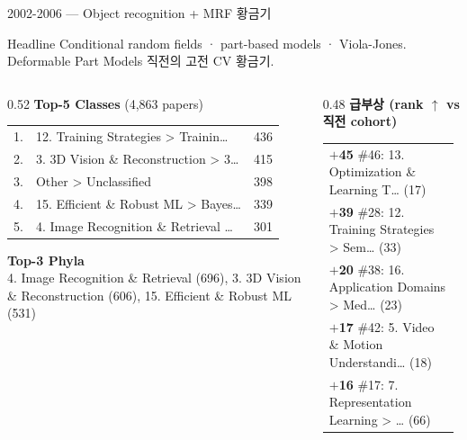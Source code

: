 \documentclass[aspectratio=169,t]{beamer}
\newcommand{\hot}[1]{\textcolor{accentorange}{\textbf{#1}}}
\newcommand{\muted}[1]{\textcolor{mutedgray}{#1}}
\begin{document}
\begin{frame}{2002-2006 \quad — \quad Object recognition + MRF 황금기}
\small
\begin{block}{Headline}
Conditional random fields · part-based models · Viola-Jones. Deformable Part Models 직전의 고전 CV 황금기.
\end{block}
\vspace{4pt}

\begin{columns}[T,onlytextwidth]
\begin{column}{0.52\textwidth}
\textbf{Top-5 Classes} \muted{\scriptsize (4,863 papers)}\\[2pt]
\scriptsize
\begin{tabular}{@{}rlr@{}}
    1. & 12. Training Strategies > Trainin… & 436 \\
    2. & 3. 3D Vision \& Reconstruction > 3… & 415 \\
    3. & Other > Unclassified & 398 \\
    4. & 15. Efficient \& Robust ML > Bayes… & 339 \\
    5. & 4. Image Recognition \& Retrieval … & 301 \\
\end{tabular}
\vspace{8pt}

\textbf{\small Top-3 Phyla}\\[2pt]
\scriptsize 4. Image Recognition \& Retrieval (696), 3. 3D Vision \& Reconstruction (606), 15. Efficient \& Robust ML (531)
\end{column}

\begin{column}{0.48\textwidth}
\textbf{급부상 (rank $\uparrow$ vs 직전 cohort)}\\[2pt]
\scriptsize
\begin{tabular}{@{}p{0.95\linewidth}@{}}
    \hot{$+$45} \#46: 13. Optimization \& Learning T… (17) \\
    \hot{$+$39} \#28: 12. Training Strategies > Sem… (33) \\
    \hot{$+$20} \#38: 16. Application Domains > Med… (23) \\
    \hot{$+$17} \#42: 5. Video \& Motion Understandi… (18) \\
    \hot{$+$16} \#17: 7. Representation Learning > … (66) \\
\end{tabular}
\end{column}
\end{columns}
\end{frame}
\end{document}
